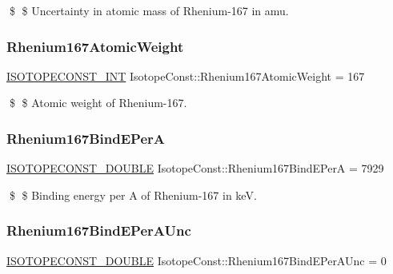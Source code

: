 \$ \$ Uncertainty in atomic mass of Rhenium-\/167 in amu. \mbox{\label{group___isotope_const-_rhenium-_re167_gac7bf3bd753bdaa7db8b482e796fc0b1e}} 
\subsubsection{\texorpdfstring{Rhenium167\+Atomic\+Weight}{Rhenium167AtomicWeight}}
{\footnotesize\ttfamily \mbox{\hyperlink{group___isotope_const-_macros_ga5f18360b3e99483a35c32d789e62621c}{I\+S\+O\+T\+O\+P\+E\+C\+O\+N\+S\+T\+\_\+\+I\+NT}} Isotope\+Const\+::\+Rhenium167\+Atomic\+Weight = 167}

\$ \$ Atomic weight of Rhenium-\/167. \mbox{\label{group___isotope_const-_rhenium-_re167_gab0b28dd5c938e04903dd4c4cb2f7075b}} 
\subsubsection{\texorpdfstring{Rhenium167\+Bind\+E\+PerA}{Rhenium167BindEPerA}}
{\footnotesize\ttfamily \mbox{\hyperlink{group___isotope_const-_macros_ga8f45a7272ce02c0b4c65c44636ed719a}{I\+S\+O\+T\+O\+P\+E\+C\+O\+N\+S\+T\+\_\+\+D\+O\+U\+B\+LE}} Isotope\+Const\+::\+Rhenium167\+Bind\+E\+PerA = 7929}

\$ \$ Binding energy per A of Rhenium-\/167 in keV. \mbox{\label{group___isotope_const-_rhenium-_re167_ga8aa2e34efec83f1eeab82449cbe8b151}} 
\subsubsection{\texorpdfstring{Rhenium167\+Bind\+E\+Per\+A\+Unc}{Rhenium167BindEPerAUnc}}
{\footnotesize\ttfamily \mbox{\hyperlink{group___isotope_const-_macros_ga8f45a7272ce02c0b4c65c44636ed719a}{I\+S\+O\+T\+O\+P\+E\+C\+O\+N\+S\+T\+\_\+\+D\+O\+U\+B\+LE}} Isotope\+Const\+::\+Rhenium167\+Bind\+E\+Per\+A\+Unc = 0}

